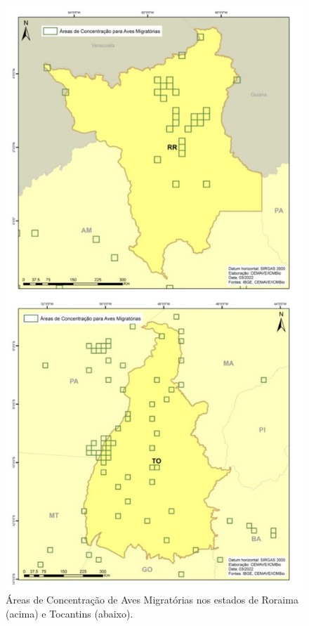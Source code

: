 \documentclass[
  oneside]{scrbook}
\begin{document}
\begin{figure}[H]

{\centering \includegraphics[width=0.7\linewidth]{imagens/cap07/Fig_18_RR_TO} 

}

\caption{Áreas de Concentração de Aves Migratórias nos estados de Roraima (acima) e Tocantins (abaixo).}\label{fig:38}
\end{figure}
\end{document}
